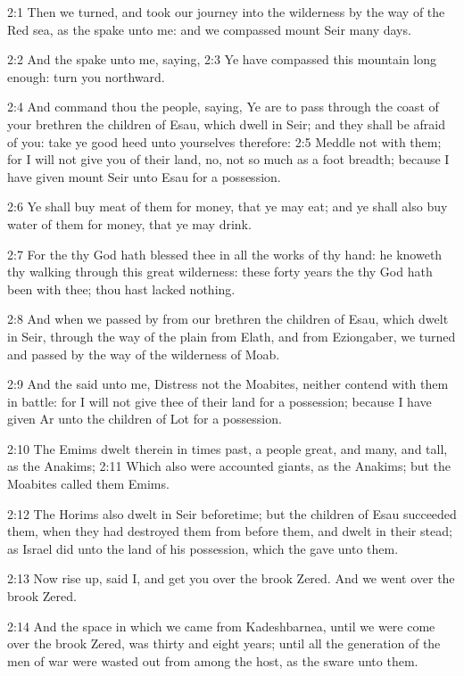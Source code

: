 2:1 Then we turned, and took our journey into the wilderness by the
way of the Red sea, as the \LORD spake unto me: and we compassed mount
Seir many days.

2:2 And the \LORD spake unto me, saying, 2:3 Ye have compassed this
mountain long enough: turn you northward.

2:4 And command thou the people, saying, Ye are to pass through the
coast of your brethren the children of Esau, which dwell in Seir; and
they shall be afraid of you: take ye good heed unto yourselves
therefore: 2:5 Meddle not with them; for I will not give you of their
land, no, not so much as a foot breadth; because I have given mount
Seir unto Esau for a possession.

2:6 Ye shall buy meat of them for money, that ye may eat; and ye shall
also buy water of them for money, that ye may drink.

2:7 For the \LORD thy God hath blessed thee in all the works of thy
hand: he knoweth thy walking through this great wilderness: these
forty years the \LORD thy God hath been with thee; thou hast lacked
nothing.

2:8 And when we passed by from our brethren the children of Esau,
which dwelt in Seir, through the way of the plain from Elath, and from
Eziongaber, we turned and passed by the way of the wilderness of Moab.

2:9 And the \LORD said unto me, Distress not the Moabites, neither
contend with them in battle: for I will not give thee of their land
for a possession; because I have given Ar unto the children of Lot for
a possession.

2:10 The Emims dwelt therein in times past, a people great, and many,
and tall, as the Anakims; 2:11 Which also were accounted giants, as
the Anakims; but the Moabites called them Emims.

2:12 The Horims also dwelt in Seir beforetime; but the children of
Esau succeeded them, when they had destroyed them from before them,
and dwelt in their stead; as Israel did unto the land of his
possession, which the \LORD gave unto them.

2:13 Now rise up, said I, and get you over the brook Zered. And we
went over the brook Zered.

2:14 And the space in which we came from Kadeshbarnea, until we were
come over the brook Zered, was thirty and eight years; until all the
generation of the men of war were wasted out from among the host, as
the \LORD sware unto them.

